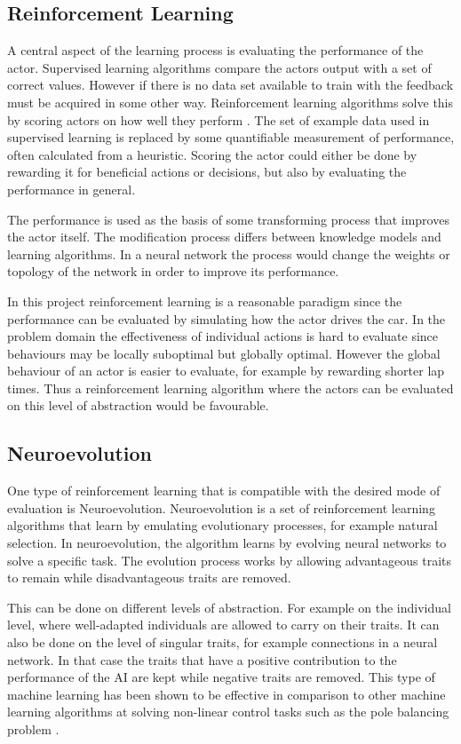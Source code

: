 \subsection{Reinforcement Learning}
A central aspect of the learning process is evaluating the performance of the actor. Supervised learning algorithms compare the actors output with a set of correct values. However if there is no data set available to train with the feedback must be acquired in some other way. Reinforcement learning algorithms solve this by scoring actors on how well they perform \cite{whiteson}. The set of example data used in supervised learning is replaced by some quantifiable measurement of performance, often calculated from a heuristic. Scoring the actor could either be done by rewarding it for beneficial actions or decisions, but also by evaluating the performance in general. 

The performance is used as the basis of some transforming process that improves the actor itself. The modification process differs between knowledge models and learning algorithms. In a neural network the process would change the weights or topology of the network in order to improve its performance.

In this project reinforcement learning is a reasonable paradigm since the performance can be evaluated by simulating how the actor drives the car. In the problem domain the effectiveness of individual actions is hard to evaluate since behaviours may be locally suboptimal but globally optimal. However the global behaviour of an actor is easier to evaluate, for example by rewarding shorter lap times. Thus a reinforcement learning algorithm where the actors can be evaluated on this level of abstraction would be favourable. 

\subsection{Neuroevolution}
One type of reinforcement learning that is  compatible with the desired mode of evaluation is Neuroevolution. Neuroevolution is a set of reinforcement learning algorithms that learn by emulating evolutionary processes, for example natural selection. In neuroevolution, the algorithm learns by evolving neural networks to solve a specific task. The evolution process works by allowing advantageous traits to remain while disadvantageous traits are removed.  

This can be done on different levels of abstraction. For example on the individual level, where well-adapted individuals are allowed to carry on their traits. It can also be done on the level of singular traits, for example connections in a neural network. In that case the traits that have a positive contribution to the performance of the AI are kept while negative traits are removed. 
This type of machine learning has been shown to be effective in comparison to other machine learning algorithms at solving non-linear control tasks such as the pole balancing problem \cite{gomez:efficient_nonlinear_control}.


